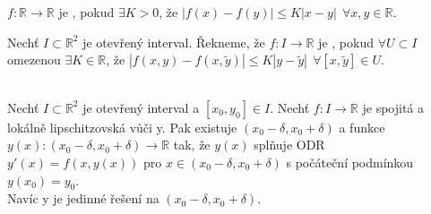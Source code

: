 \begin{definice}
	\(f: \mathbb{R} \to \mathbb{R}\) je , 
	pokud \(\exists K > 0\), že \(|f(x) - f(y)| \leq K |x - y| \ \  \forall x,y \in \mathbb{R}\).
\end{definice}

\begin{definice}
	Nechť \(I \subset \mathbb{R}^{2}\) je otevřený interval. Řekneme, 
	že \(f: I \to \mathbb{R}\) je , 
	pokud \(\forall U \subset I\) omezenou \(\exists K \in \mathbb{R}\), že
	\(|f(x,y) - f(x, \tilde{y})| \leq K |y - \tilde{y}| \ \ \forall [x, \tilde{y}] \in U\).
\end{definice}

\begin{vetat}
	\\
	Nechť \(I \subset \mathbb{R}^{2}\) je otevřený interval a \([x_0, y_0] \in I\). Nechť \(f: I \to \mathbb{R}\)
	je spojitá a lokálně lipschitzovská vůči y. Pak existuje \((x_0 - \delta, x_0 + \delta)\) a funkce
	\(y(x): (x_0 - \delta, x_0 + \delta) \to \mathbb{R}\) tak, že \(y(x)\) splňuje ODR
	\(y'(x) = f(x, y(x))\) pro \(x \in (x_0 - \delta, x_0 + \delta)\) s počáteční podmínkou \(y(x_0) = y_0\).
	\\
	Navíc y je jedinné řešení na \((x_0 - \delta, x_0 + \delta)\).
\end{vetat}